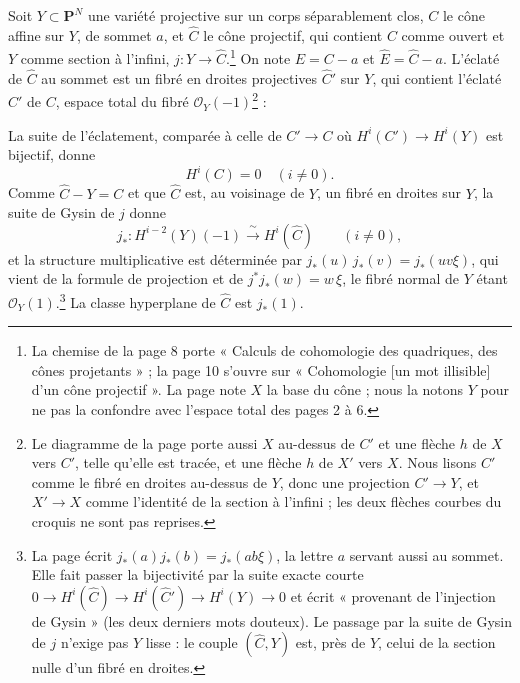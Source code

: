 \documentclass[11pt,a4paper]{article}
\begin{document}
Soit $Y \subset \mathbf{P}^{N}$ une variété projective sur un corps
séparablement clos, $C$ le cône affine sur $Y$, de sommet $a$, et
$\widehat{C}$ le cône projectif, qui contient $C$ comme ouvert et $Y$ comme
section à l'infini, $j : Y \to \widehat{C}$.\footnote{La chemise de la page 8
porte « Calculs de cohomologie des quadriques, des cônes projetants » ;
la page 10 s'ouvre sur « Cohomologie [un mot illisible] d'un cône
projectif ». La page note $X$ la base du cône ; nous la notons $Y$ pour
ne pas la confondre avec l'espace total des pages 2 à 6.} On note
$E = C - a$ et $\widehat{E} = \widehat{C} - a$. L'éclaté de $\widehat{C}$
au sommet est un fibré en droites projectives $\widehat{C}'$ sur $Y$, qui
contient l'éclaté $C'$ de $C$, espace total du fibré
$\mathcal{O}_{Y}(-1)$\footnote{Le diagramme de la page porte aussi $X$ au-dessus de $C'$ et une
flèche $h$ de $X$ vers $C'$, telle qu'elle est tracée, et une flèche $h$
de $X'$ vers $X$. Nous lisons $C'$ comme le fibré en droites au-dessus de
$Y$, donc une projection $C' \to Y$, et $X' \to X$ comme l'identité de la
section à l'infini ; les deux flèches courbes du croquis ne sont pas
reprises.} :


La suite de l'éclatement, comparée à celle de $C' \to C$ où
$H^{i}(C') \to H^{i}(Y)$ est bijectif, donne
\[
  H^{i}(C) = 0 \quad (i \neq 0) .
\]
Comme $\widehat{C} - Y = C$ et que $\widehat{C}$ est, au voisinage de $Y$,
un fibré en droites sur $Y$, la suite de Gysin de $j$ donne
\[
  j_{*} : H^{i-2}(Y)(-1) \xrightarrow{\ \sim\ } H^{i}(\widehat{C}) \qquad (i \neq 0),
\]
et la structure multiplicative est déterminée par
$j_{*}(u)\, j_{*}(v) = j_{*}(uv\xi)$, qui vient de la formule de
projection et de $j^{*}j_{*}(w) = w\,\xi$, le fibré normal de $Y$ étant
$\mathcal{O}_{Y}(1)$.\footnote{La page écrit $j_{*}(a)j_{*}(b) = j_{*}(ab\xi)$, la lettre $a$ servant aussi au sommet. Elle fait passer la bijectivité par la
suite exacte courte
$0 \to H^{i}(\widehat{C}) \to H^{i}(\widehat{C}') \to H^{i}(Y) \to 0$ et
écrit « provenant de l'injection de Gysin » (les deux derniers mots douteux). Le passage par
la suite de Gysin de $j$ n'exige pas $Y$ lisse : le couple
$(\widehat{C}, Y)$ est, près de $Y$, celui de la section nulle d'un fibré
en droites.} La classe hyperplane de $\widehat{C}$ est $j_{*}(1)$.
\end{document}
